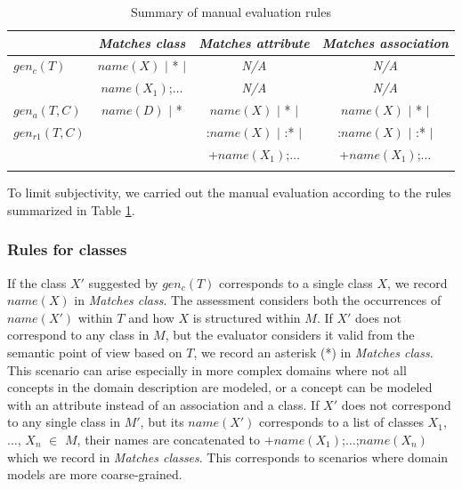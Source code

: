 \begin{table}[!h]
    \scriptsize
    \centering
    \setlength{\tabcolsep}{0.5em}
    \begin{tabular}{lccc}
                     & \emph{Matches class}        & \emph{Matches attribute} & \emph{Matches association} \\
\toprule
\addlinespace
        $gen_c(T)$   & $name(X)$ $\vert$ * $\vert$ & \emph{N/A}  & \emph{N/A} \\
                     & $name(X_1)$;$\ldots$        & \emph{N/A}  & \emph{N/A} \\
\addlinespace
\midrule
\addlinespace
        $gen_a(T,C)$ & $name(D)$ $\vert$ *         & $name(X)$ $\vert$ * $\vert$ & $name(X)$ $\vert$ * $\vert$ \\
        $gen_{r1}(T,C)$ &                             & :$name(X)$ $\vert$ :* $\vert$ & :$name(X)$ $\vert$ :* $\vert$ \\
                     &                             & +$name(X_1)$;$\ldots$        & +$name(X_1)$;$\ldots$ \\
\addlinespace
\bottomrule
    \end{tabular}
    \caption{Summary of manual evaluation rules}
    \label{tab:manual-assessment-of-suggestions}
\end{table}

To limit subjectivity, we carried out the manual evaluation according to the rules summarized in Table \ref{tab:manual-assessment-of-suggestions}.


\subsubsection{Rules for classes}
If the class $X'$ suggested by $gen_c(T)$ corresponds to a single class $X$, we record $name(X)$ in \emph{Matches class}.
The assessment considers both the occurrences of $name(X')$ within $T$ and how $X$ is structured within $M$.
If $X'$ does not correspond to any class in $M$, but the evaluator considers it valid from the semantic point of view based on $T$, we record an asterisk (*) in \emph{Matches class}.
This scenario can arise especially in more complex domains where not all concepts in the domain description are modeled, or a concept can be modeled with an attribute instead of an association and a class.
If $X'$ does not correspond to any single class in $M'$, but its $name(X')$ corresponds to a list of classes $X_1$, $\ldots$, $X_n$ $\in$ $M$, their names are concatenated to $+name(X_1)$;$\ldots$;$name(X_n)$ which we record in \emph{Matches classes}. This corresponds to scenarios where domain models are more coarse-grained.

